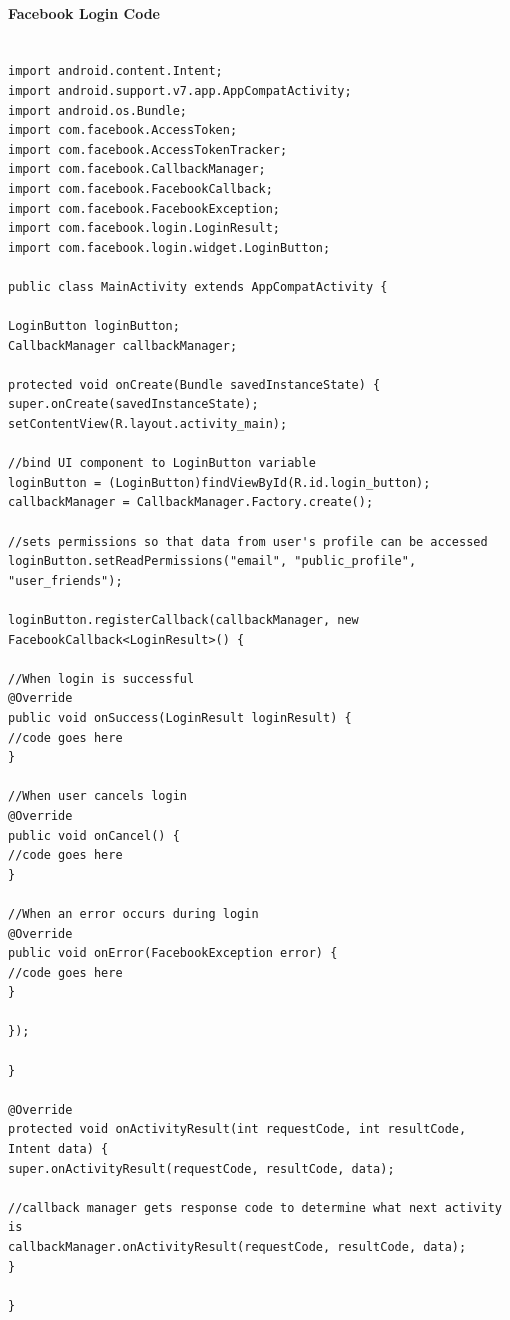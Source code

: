 \documentclass{article}
\begin{document}
\paragraph{Facebook Login Code}
\begin{lstlisting}

import android.content.Intent;
import android.support.v7.app.AppCompatActivity;
import android.os.Bundle;
import com.facebook.AccessToken;
import com.facebook.AccessTokenTracker;
import com.facebook.CallbackManager;
import com.facebook.FacebookCallback;
import com.facebook.FacebookException;
import com.facebook.login.LoginResult;
import com.facebook.login.widget.LoginButton;

public class MainActivity extends AppCompatActivity {

LoginButton loginButton;
CallbackManager callbackManager;

protected void onCreate(Bundle savedInstanceState) {
super.onCreate(savedInstanceState);
setContentView(R.layout.activity_main);

//bind UI component to LoginButton variable
loginButton = (LoginButton)findViewById(R.id.login_button);
callbackManager = CallbackManager.Factory.create();

//sets permissions so that data from user's profile can be accessed
loginButton.setReadPermissions("email", "public_profile", "user_friends");

loginButton.registerCallback(callbackManager, new FacebookCallback<LoginResult>() {

//When login is successful
@Override
public void onSuccess(LoginResult loginResult) {
//code goes here
}

//When user cancels login
@Override
public void onCancel() {
//code goes here
}

//When an error occurs during login
@Override
public void onError(FacebookException error) {
//code goes here
}

});

}

@Override
protected void onActivityResult(int requestCode, int resultCode, Intent data) {
super.onActivityResult(requestCode, resultCode, data);

//callback manager gets response code to determine what next activity is
callbackManager.onActivityResult(requestCode, resultCode, data);
}

}

\end{lstlisting}
\end{document}
